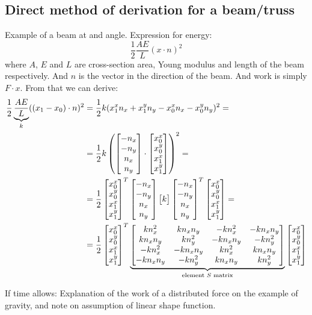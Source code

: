 \documentclass[12pt]{article}
\begin{document}
\subsection{Direct method of derivation for a beam/truss}

Example of a beam at and angle. Expression for energy:
\[\frac{1}{2}\frac{AE}{L}(x\cdot n)^2\]
where $A$, $E$ and $L$ are cross-section area, Young modulus and length of the beam respectively. And $n$ is the vector in the direction of the beam. And work is simply $F\cdot x$. From that we can derive:
\begin{align*}\frac{1}{2}\underbrace{\frac{AE}{L}}_k((x_1-x_0)\cdot n)^2 &= \frac{1}{2}k(x^x_1n_x+x^y_1n_y-x^x_0n_x-x^y_0n_y)^2 =\\
&= \frac{1}{2}k\left(\left[\begin{matrix}-n_x\\-n_y\\n_x\\n_y\end{matrix}\right]\cdot\left[\begin{matrix}x^x_0\\x^y_0\\x^x_1\\x^y_1\end{matrix}\right]\right)^2 =\\
&= \frac{1}{2}\left[\begin{matrix}x^x_0\\x^y_0\\x^x_1\\x^y_1\end{matrix}\right]^T\left[\begin{matrix}-n_x\\-n_y\\n_x\\n_y\end{matrix}\right]\left[\begin{matrix}k\end{matrix}\right]\left[\begin{matrix}-n_x\\-n_y\\n_x\\n_y\end{matrix}\right]^T\left[\begin{matrix}x^x_0\\x^y_0\\x^x_1\\x^y_1\end{matrix}\right] =\\
&= \frac{1}{2}\left[\begin{matrix}x^x_0\\x^y_0\\x^x_1\\x^y_1\end{matrix}\right]^T\underbrace{\left[\begin{matrix}kn_x^2 & kn_xn_y & -kn_x^2 & -kn_xn_y\\kn_xn_y & kn_y^2 & -kn_xn_y & -kn_y^2\\-kn_x^2 & -kn_xn_y & kn_x^2 & kn_xn_y\\-kn_xn_y & -kn_y^2 & kn_xn_y & kn_y^2\end{matrix}\right]}_\text{element $S$ matrix}\left[\begin{matrix}x^x_0\\x^y_0\\x^x_1\\x^y_1\end{matrix}\right]\\
\end{align*}

If time allows:
Explanation of the work of a distributed force on the example of gravity, and note on assumption of linear shape function.
\end{document}

